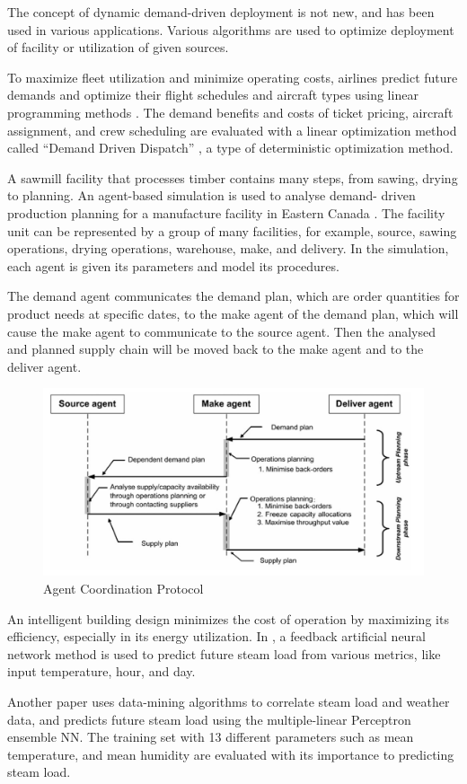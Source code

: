 The concept of dynamic demand-driven deployment is not new,
and has been used in various applications. Various algorithms
are used to optimize deployment of facility or utilization
of given sources.

To maximize fleet utilization and minimize
operating costs, airlines predict future demands
and optimize their flight schedules and aircraft
types using linear programming methods \cite{berge_demand_1993}. The demand
benefits and costs of ticket pricing, aircraft assignment, and crew 
scheduling are evaluated with a linear optimization method called
 ``Demand Driven Dispatch'' \cite{shebalov_practical_2009}, a type
of deterministic optimization method.

A sawmill facility that processes timber contains 
many steps, from sawing, drying to planning. An
agent-based simulation is used to analyse demand-
driven production planning for a manufacture facility
in Eastern Canada \cite{yanez_agent-based_2009}.
The facility unit can be represented by a group of many facilities,
for example, source, sawing operations, drying operations, warehouse,
make, and delivery. In the simulation, each agent is given its parameters
and model its procedures.

The demand agent communicates the demand plan, which are
order quantities for product needs at specific dates,
to the make agent of the demand plan,
which will cause the make agent to communicate to the source agent. Then the
analysed and planned supply chain will be moved back to the make agent and
to the deliver agent.

\begin{figure}
	\includegraphics[width=\textwidth]{./images/timber_process.png}
	\caption{Agent Coordination Protocol \cite{yanez_agent-based_2009} } 
	\label{fig:timber_process}
\end{figure}


An intelligent building design minimizes 
the cost of operation by maximizing its efficiency,
especially in its energy utilization. In 
\cite{gonzalez_detailed_2002}, a feedback artificial neural
network method is used to predict future steam load from various
metrics, like input temperature, hour, and day.

Another paper \cite{kusiak_data-driven_2010} uses data-mining algorithms
to correlate steam load and weather data, and predicts
future steam load using the multiple-linear Perceptron ensemble
NN. The training set with 13 different parameters such as mean temperature,
and mean humidity are evaluated with its importance to predicting steam load.

